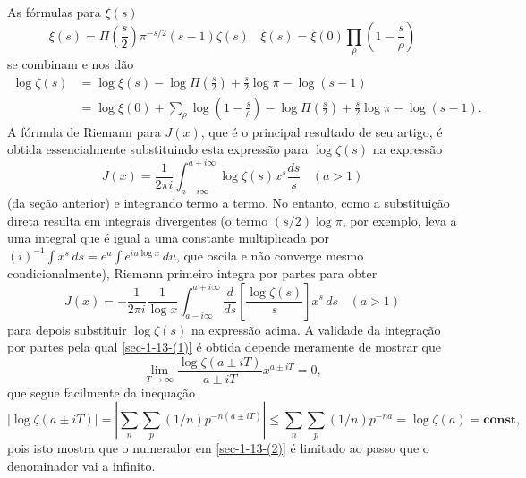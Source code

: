     
    As fórmulas para $\xi(s)$
    \begin{equation*}
        \xi(s) = \Pi \left( \frac{s}{2} \right) \pi^{-s/2} (s-1) \zeta(s) \ \ \ \ \xi(s) = \xi(0) \prod_{\rho} \left( 1 - \frac{s}{\rho} \right)
    \end{equation*}
    se combinam e nos dão
    \begin{align*}
        \log \zeta(s) &= \log \xi(s) - \log \Pi \left( \frac{s}{2} \right) + \frac{s}{2} \log \pi - \log (s-1)\\
        &= \log \xi(0) + \sum_{\rho} \log \left( 1 - \frac{s}{\rho} \right) - \log \Pi \left( \frac{s}{2} \right) + \frac{s}{2} \log \pi - \log (s-1).
    \end{align*}
    A fórmula de Riemann para $J(x)$, que é o principal resultado de seu artigo, é obtida essencialmente substituindo esta expressão para $\log \zeta(s)$ na expressão
    \begin{equation*}
        J(x) = \frac{1}{2\pi i} \int_{a - i\infty}^{a + i\infty} \log \zeta(s) x^s \frac{ds}{s} \ \ \ \ (a > 1)
    \end{equation*}
    (da seção anterior) e integrando termo a termo. No entanto, como a substituição direta resulta em integrais divergentes (o termo $(s/2) \log \pi$, por exemplo, leva a uma integral que é igual a uma constante multiplicada por $(i)^{-1} \int x^s \, ds = e^a \int e^{i u \log x} \, du$, que oscila e não converge mesmo condicionalmente), Riemann primeiro integra por partes para obter 
    \begin{equation}
        \label{sec-1-13-(1)}
        J(x) = -\frac{1}{2 \pi i} \frac{1}{\log x} \int_{a - i\infty}^{a + i\infty} \frac{d}{ds} \left[ \frac{\log \zeta(s)}{s} \right] x^s \, ds\ \ \ \ (a>1)
    \end{equation}
    para depois substituir $\log \zeta(s)$ na expressão acima. A validade da integração por partes pela qual \eqref{sec-1-13-(1)} é obtida depende meramente de mostrar que 
    \begin{equation}
        \label{sec-1-13-(2)}
        \lim_{T \to \infty} \frac{\log \zeta(a \pm iT)}{a \pm iT} x^{a \pm iT} = 0,
    \end{equation}
    que segue facilmente da inequação
    \begin{equation}
        \label{sec-1-13-(3)}
        | \log \zeta(a \pm iT) | = \left| \sum_n \sum_p (1/n) p^{-n(a \pm iT)} \right| \leq  \sum_n \sum_p (1/n) p^{-na} = \log \zeta(a) = \textbf{const},
    \end{equation}
    pois isto mostra que o numerador em \eqref{sec-1-13-(2)} é limitado ao passo que o denominador vai a infinito.
    
